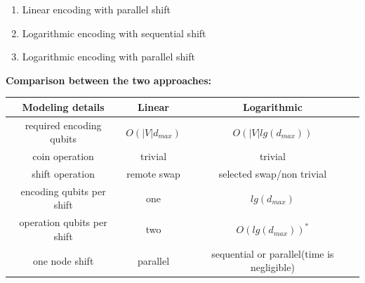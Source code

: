 \documentclass{article}
\begin{document}
    \begin{enumerate}
        \item Linear encoding with parallel shift
        \item Logarithmic encoding with sequential shift
        \item Logarithmic encoding with parallel shift
    \end{enumerate}

    \textbf{Comparison between the two approaches:}\\
    
    \begin{tabular}{|c | c | c|} 
     \hline
     \textbf{Modeling details} & \textbf{Linear} & \textbf{Logarithmic} \\
     \hline
     required encoding qubits & $O(|V|d_{max})$ & $O(|V|lg(d_{max}))$ \\ 
     \hline
     coin operation & trivial & trivial\\ 
     \hline
     shift operation & remote swap & selected swap/non trivial\\
     \hline
     encoding qubits per shift & one & $lg(d_{max})$ \\
     \hline
     operation qubits per shift & two & $O(lg(d_{max}))^{*}$\\
     \hline
     one node shift & parallel & sequential or parallel(time is negligible) \\  
     \hline
    \end{tabular}\\ \\
\end{document}
